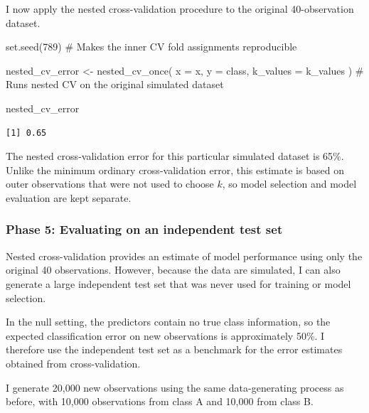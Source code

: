 \documentclass[
  letterpaper,
  DIV=11,
  numbers=noendperiod]{scrreprt}
\newenvironment{Shaded}{\begin{snugshade}}{\end{snugshade}}
\newcommand{\AttributeTok}[1]{\textcolor[rgb]{0.40,0.45,0.13}{#1}}
\newcommand{\CommentTok}[1]{\textcolor[rgb]{0.37,0.37,0.37}{#1}}
\newcommand{\DecValTok}[1]{\textcolor[rgb]{0.68,0.00,0.00}{#1}}
\newcommand{\FunctionTok}[1]{\textcolor[rgb]{0.28,0.35,0.67}{#1}}
\newcommand{\NormalTok}[1]{\textcolor[rgb]{0.00,0.23,0.31}{#1}}
\newcommand{\OtherTok}[1]{\textcolor[rgb]{0.00,0.23,0.31}{#1}}
\begin{document}
I now apply the nested cross-validation procedure to the original
40-observation dataset.

\begin{Shaded}
\begin{Highlighting}[]
\FunctionTok{set.seed}\NormalTok{(}\DecValTok{789}\NormalTok{) }\CommentTok{\# Makes the inner CV fold assignments reproducible}

\NormalTok{nested\_cv\_error }\OtherTok{\textless{}{-}} \FunctionTok{nested\_cv\_once}\NormalTok{(}
  \AttributeTok{x =}\NormalTok{ x,}
  \AttributeTok{y =}\NormalTok{ class,}
  \AttributeTok{k\_values =}\NormalTok{ k\_values}
\NormalTok{) }\CommentTok{\# Runs nested CV on the original simulated dataset}

\NormalTok{nested\_cv\_error}
\end{Highlighting}
\end{Shaded}

\begin{verbatim}
[1] 0.65
\end{verbatim}

The nested cross-validation error for this particular simulated dataset
is 65\%. Unlike the minimum ordinary cross-validation error, this
estimate is based on outer observations that were not used to choose
\(k\), so model selection and model evaluation are kept separate.

\subsubsection{Phase 5: Evaluating on an independent test
set}\label{phase-5-evaluating-on-an-independent-test-set}

Nested cross-validation provides an estimate of model performance using
only the original 40 observations. However, because the data are
simulated, I can also generate a large independent test set that was
never used for training or model selection.

In the null setting, the predictors contain no true class information,
so the expected classification error on new observations is
approximately 50\%. I therefore use the independent test set as a
benchmark for the error estimates obtained from cross-validation.

I generate 20,000 new observations using the same data-generating
process as before, with 10,000 observations from class A and 10,000 from
class B.
\end{document}
